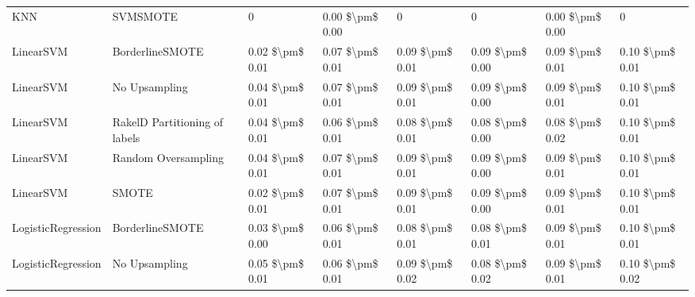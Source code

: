 \begin{tabular}{llllllll}
                            KNN &                      SVMSMOTE &               0 &           0.00 \$\textbackslash pm\$ 0.00 &                     0 &                      0 &                         0.00 \$\textbackslash pm\$ 0.00 &               0 \\
                      LinearSVM &               BorderlineSMOTE & 0.02 \$\textbackslash pm\$ 0.01 &           0.07 \$\textbackslash pm\$ 0.01 &       0.09 \$\textbackslash pm\$ 0.01 &        0.09 \$\textbackslash pm\$ 0.00 &                         0.09 \$\textbackslash pm\$ 0.01 & 0.10 \$\textbackslash pm\$ 0.01 \\
                      LinearSVM &                 No Upsampling & 0.04 \$\textbackslash pm\$ 0.01 &           0.07 \$\textbackslash pm\$ 0.01 &       0.09 \$\textbackslash pm\$ 0.01 &        0.09 \$\textbackslash pm\$ 0.00 &                         0.09 \$\textbackslash pm\$ 0.01 & 0.10 \$\textbackslash pm\$ 0.01 \\
                      LinearSVM & RakelD Partitioning of labels & 0.04 \$\textbackslash pm\$ 0.01 &           0.06 \$\textbackslash pm\$ 0.01 &       0.08 \$\textbackslash pm\$ 0.01 &        0.08 \$\textbackslash pm\$ 0.00 &                         0.08 \$\textbackslash pm\$ 0.02 & 0.10 \$\textbackslash pm\$ 0.01 \\
                      LinearSVM &           Random Oversampling & 0.04 \$\textbackslash pm\$ 0.01 &           0.07 \$\textbackslash pm\$ 0.01 &       0.09 \$\textbackslash pm\$ 0.01 &        0.09 \$\textbackslash pm\$ 0.00 &                         0.09 \$\textbackslash pm\$ 0.01 & 0.10 \$\textbackslash pm\$ 0.01 \\
                      LinearSVM &                         SMOTE & 0.02 \$\textbackslash pm\$ 0.01 &           0.07 \$\textbackslash pm\$ 0.01 &       0.09 \$\textbackslash pm\$ 0.01 &        0.09 \$\textbackslash pm\$ 0.00 &                         0.09 \$\textbackslash pm\$ 0.01 & 0.10 \$\textbackslash pm\$ 0.01 \\
             LogisticRegression &               BorderlineSMOTE & 0.03 \$\textbackslash pm\$ 0.00 &           0.06 \$\textbackslash pm\$ 0.01 &       0.08 \$\textbackslash pm\$ 0.01 &        0.08 \$\textbackslash pm\$ 0.01 &                         0.09 \$\textbackslash pm\$ 0.01 & 0.10 \$\textbackslash pm\$ 0.01 \\
             LogisticRegression &                 No Upsampling & 0.05 \$\textbackslash pm\$ 0.01 &           0.06 \$\textbackslash pm\$ 0.01 &       0.09 \$\textbackslash pm\$ 0.02 &        0.08 \$\textbackslash pm\$ 0.02 &                         0.09 \$\textbackslash pm\$ 0.01 & 0.10 \$\textbackslash pm\$ 0.02 \\

\end{tabular}
